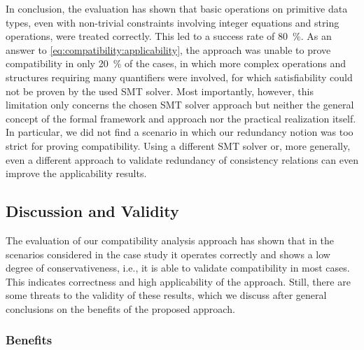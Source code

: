 In conclusion, the evaluation has shown that basic operations on primitive data types, even with non-trivial constraints involving integer equations and string operations, were treated correctly.
This led to a success rate of \SI{80}{\percent}.
As an answer to \autoref{eq:compatibility:applicability}, the approach was unable to prove compatibility in only \SI{20}{\percent} of the cases, in which more complex operations and structures requiring many quantifiers were involved, for which satisfiability could not be proven by the used \gls{SMT} solver.
Most importantly, however, this limitation only concerns the chosen \gls{SMT} solver approach but neither the general concept of the formal framework and approach nor the practical realization itself.
In particular, we did not find a scenario in which our redundancy notion was too strict for proving compatibility.
Using a different \gls{SMT} solver or, more generally, even a different approach to validate redundancy of consistency relations can even improve the applicability results.


\subsection{Discussion and Validity}

The evaluation of our compatibility analysis approach has shown that in the scenarios considered in the case study it operates correctly and shows a low degree of conservativeness, i.e., it is able to validate compatibility in most cases.
This indicates correctness and high applicability of the approach.
Still, there are some threats to the validity of these results, which we discuss after general conclusions on the benefits of the proposed approach.

\subsubsection{Benefits}


